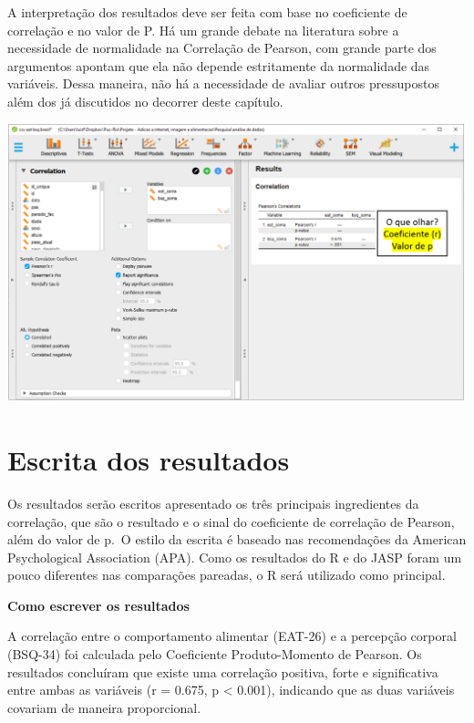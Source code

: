 \documentclass[
]{book}
\newenvironment{writing}{
  \definecolor{shadecolor}{rgb}{0, 0, 0}  %
  \color{white}
  \begin{shaded}}
 {\end{shaded}}
\begin{document}
A interpretação dos resultados deve ser feita com base no coeficiente de correlação e no valor de P. Há um grande debate na literatura sobre a necessidade de normalidade na Correlação de Pearson, com grande parte dos argumentos apontam que ela não depende estritamente da normalidade das variáveis. Dessa maneira, não há a necessidade de avaliar outros pressupostos além dos já discutidos no decorrer deste capítulo.

\includegraphics{./img/cap_correlacao_resultados.png}

\hypertarget{escrita-dos-resultados-3}{%
\section{Escrita dos resultados}\label{escrita-dos-resultados-3}}

Os resultados serão escritos apresentado os três principais ingredientes da correlação, que são o resultado e o sinal do coeficiente de correlação de Pearson, além do valor de p.~O estilo da escrita é baseado nas recomendações da American Psychological Association (APA). Como os resultados do R e do JASP foram um pouco diferentes nas comparações pareadas, o R será utilizado como principal.

\begin{writing}

\textbf{Como escrever os resultados}

A correlação entre o comportamento alimentar (EAT-26) e a percepção corporal (BSQ-34) foi calculada pelo Coeficiente Produto-Momento de Pearson. Os resultados concluíram que existe uma correlação positiva, forte e significativa entre ambas as variáveis (r = 0.675, p \textless{} 0.001), indicando que as duas variáveis covariam de maneira proporcional.

\end{writing}
\end{document}
